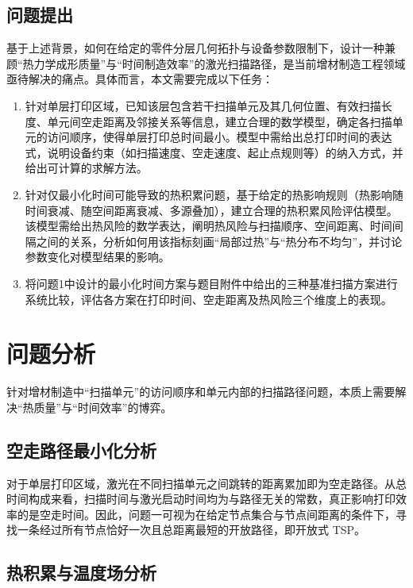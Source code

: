 \documentclass[a4paper, 12pt]{ctexart}
\begin{document}
\subsection{问题提出}

基于上述背景，如何在给定的零件分层几何拓扑与设备参数限制下，设计一种兼顾“热力学成形质量”与“时间制造效率”的激光扫描路径，是当前增材制造工程领域亟待解决的痛点。具体而言，本文需要完成以下任务：

\begin{enumerate}
    \item 针对单层打印区域，已知该层包含若干扫描单元及其几何位置、有效扫描长度、单元间空走距离及邻接关系等信息，建立合理的数学模型，确定各扫描单元的访问顺序，使得单层打印总时间最小。模型中需给出总打印时间的表达式，说明设备约束（如扫描速度、空走速度、起止点规则等）的纳入方式，并给出可计算的求解方法。

    \item 针对仅最小化时间可能导致的热积累问题，基于给定的热影响规则（热影响随时间衰减、随空间距离衰减、多源叠加），建立合理的热积累风险评估模型。该模型需给出热风险的数学表达，阐明热风险与扫描顺序、空间距离、时间间隔之间的关系，分析如何用该指标刻画“局部过热”与“热分布不均匀”，并讨论参数变化对模型结果的影响。

    \item 将问题1中设计的最小化时间方案与题目附件中给出的三种基准扫描方案进行系统比较，评估各方案在打印时间、空走距离及热风险三个维度上的表现。
\end{enumerate}

\vspace{1em}
\section{问题分析}
\vspace{0.5em}
针对增材制造中“扫描单元”的访问顺序和单元内部的扫描路径问题，本质上需要解决“热质量”与“时间效率”的博弈。

\subsection{空走路径最小化分析}

对于单层打印区域，激光在不同扫描单元之间跳转的距离累加即为空走路径。从总时间构成来看，扫描时间与激光启动时间均为与路径无关的常数，真正影响打印效率的是空走时间。因此，问题一可视为在给定节点集合与节点间距离的条件下，寻找一条经过所有节点恰好一次且总距离最短的开放路径，即开放式 TSP。

\subsection{热积累与温度场分析}
\end{document}
